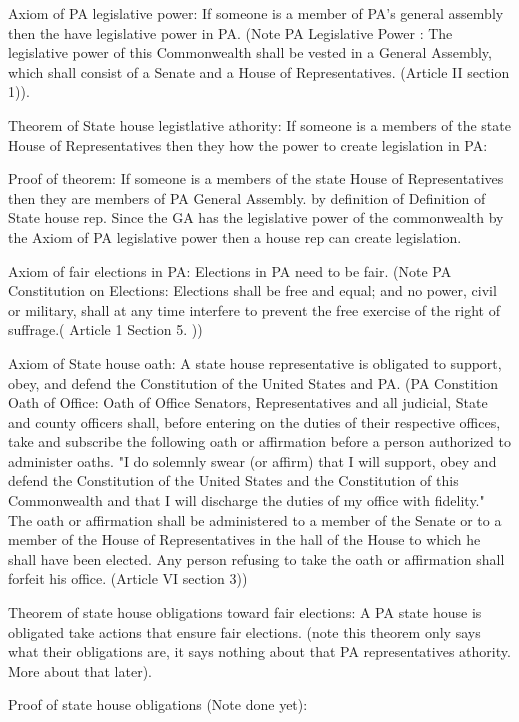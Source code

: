 \documentclass[11pt]{article} %
\begin{document}
\begin{enumerate}
Axiom of PA legislative power:  If someone is a member of PA's general assembly then the have legislative power in PA.  (Note PA Legislative Power : The legislative power of this Commonwealth shall be vested in a General Assembly, which shall consist of a Senate and a House of Representatives. (Article II section 1)).

Theorem of State house legistlative athority: If someone is a members of the state House of Representatives then they how the power to create legislation in PA: 

Proof of theorem:
If someone is a members of the state House of Representatives then they are members of PA General Assembly. by definition of Definition of State house rep.  Since the GA has the legislative power of the commonwealth by the Axiom of PA legislative power then a house rep can create legislation. 


Axiom of fair elections in PA: Elections in PA need to be fair. (Note PA Constitution on Elections: Elections shall be free and equal; and no power, civil or military, shall at any time interfere to prevent the free exercise of the right of suffrage.( Article 1 Section 5. ))

Axiom of State house oath: A state house representative is obligated to support, obey, and defend the  Constitution of the United States and PA. (PA Constition Oath of Office: Oath of Office  Senators, Representatives and all judicial, State and county officers shall, before entering on the duties of their respective offices, take and subscribe the following oath or affirmation before a person authorized to administer oaths. "I do solemnly swear (or affirm) that I will support, obey and defend the Constitution of the United States and the Constitution of this Commonwealth and that I will discharge the duties of my office with fidelity." The oath or affirmation shall be administered to a member of the Senate or to a member of the House of Representatives in the hall of the House to which he shall have been elected. Any person refusing to take the oath or affirmation shall forfeit his office. (Article VI section 3))

Theorem of state house obligations toward fair elections:  A PA state house is obligated take actions that ensure fair elections. (note this theorem only says what their obligations are, it says nothing about that PA representatives athority. More about that later).

Proof of state house obligations (Note done yet):


\end{enumerate}
\end{document}
